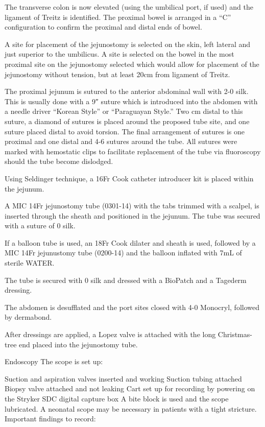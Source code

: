 \documentclass[
]{book}
\begin{document}
The transverse colon is now elevated (using the umbilical port, if used) and the ligament of Treitz is identified. The proximal bowel is arranged in a ``C'' configuration to confirm the proximal and distal ends of bowel.

A site for placement of the jejunostomy is selected on the skin, left lateral and just superior to the umbilicus. A site is selected on the bowel in the most proximal site on the jejunostomy selected which would allow for placement of the jejunostomy without tension, but at least 20cm from ligament of Treitz.

The proximal jejunum is sutured to the anterior abdominal wall with 2-0 silk. This is usually done with a 9″ suture which is introduced into the abdomen with a needle driver ``Korean Style'' or ``Paraguayan Style.'' Two cm distal to this suture, a diamond of sutures is placed around the proposed tube site, and one suture placed distal to avoid torsion. The final arrangement of sutures is one proximal and one distal and 4-6 sutures around the tube. All sutures were marked with hemostatic clips to facilitate replacement of the tube via fluoroscopy should the tube become dislodged.

Using Seldinger technique, a 16Fr Cook catheter introducer kit is placed within the jejunum.

A MIC 14Fr jejunostomy tube (0301-14) with the tabs trimmed with a scalpel, is inserted through the sheath and positioned in the jejunum. The tube was secured with a suture of 0 silk.

If a balloon tube is used, an 18Fr Cook dilater and sheath is used, followed by a MIC 14Fr jejunustomy tube (0200-14) and the balloon inflated with 7mL of sterile WATER.

The tube is secured with 0 silk and dressed with a BioPatch and a Tagederm dressing.

The abdomen is desufflated and the port sites closed with 4-0 Monocryl, followed by dermabond.

After dressings are applied, a Lopez valve is attached with the long Christmas-tree end placed into the jejunostomy tube.

Endoscopy
The scope is set up:

Suction and aspiration valves inserted and working
Suction tubing attached
Biopsy valve attached and not leaking
Cart set up for recording by powering on the Stryker SDC digital capture box
A bite block is used and the scope lubricated. A neonatal scope may be necessary in patients with a tight stricture. Important findings to record:
\end{document}
